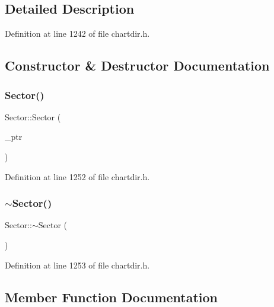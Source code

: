 \subsection{Detailed Description}


Definition at line 1242 of file chartdir.\+h.



\subsection{Constructor \& Destructor Documentation}
\mbox{\label{class_sector_a1649735a193918272eaa6dcc08e61ece}} 
\subsubsection{\texorpdfstring{Sector()}{Sector()}}
{\footnotesize\ttfamily Sector\+::\+Sector (\begin{DoxyParamCaption}\item[{Sector\+Internal $\ast$}]{\+\_\+ptr }\end{DoxyParamCaption})\hspace{0.3cm}{\ttfamily [inline]}}



Definition at line 1252 of file chartdir.\+h.

\mbox{\label{class_sector_aa0f54aaf079dd7461400684bf0be15ff}} 
\subsubsection{\texorpdfstring{$\sim$\+Sector()}{~Sector()}}
{\footnotesize\ttfamily Sector\+::$\sim$\+Sector (\begin{DoxyParamCaption}{ }\end{DoxyParamCaption})\hspace{0.3cm}{\ttfamily [inline]}}



Definition at line 1253 of file chartdir.\+h.



\subsection{Member Function Documentation}
\mbox{\label{class_sector_a1633502a6429c3dd568b74c9c1927d09}} 
